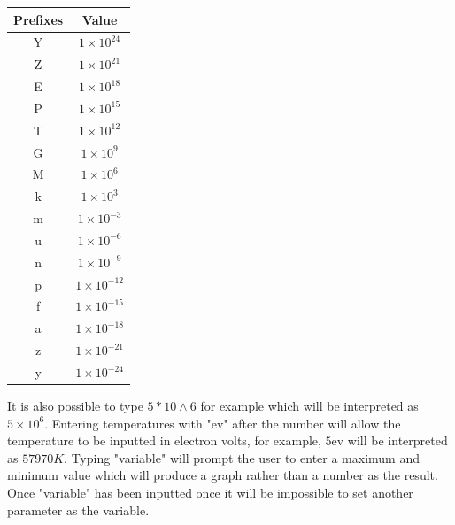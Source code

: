 \documentclass{journal}
\begin{document}
\smallskip

\begin{table}[H]
    \begin{adjustwidth}{4cm}{}
        \label{tab:ValueTable}
        \begin{tabular}{|c|c|} 
        \hline
        Prefixes & Value \\
        \hline
        Y  & $1 \times 10^{24}$ \\
        \hline
        Z & $1 \times 10^{21}$ \\
        \hline
        E & $1 \times 10^{18}$ \\
        \hline
        P & $1 \times 10^{15}$ \\
        \hline
        T & $1 \times 10^{12}$ \\
        \hline
        G & $1 \times 10^{9}$ \\
        \hline
        M & $1 \times 10^{6}$ \\
        \hline
        k & $1 \times 10^{3}$ \\
        \hline
        m & $1 \times 10^{-3}$ \\
        \hline
        u & $1 \times 10^{-6}$ \\
        \hline
        n & $1 \times 10^{-9}$ \\
        \hline
        p & $1 \times 10^{-12}$ \\
        \hline
        f & $1 \times 10^{-15}$ \\
        \hline
        a & $1 \times 10^{-18}$ \\
        \hline
        z & $1 \times 10^{-21}$ \\
        \hline
        y & $1 \times 10^{-24}$ \\
        \hline
        \end{tabular}
    \end{adjustwidth}
\end{table}

\smallskip

It is also possible to type $5 \ast 10 \wedge 6$ for example which will be interpreted as 
$5 \times 10^{6}$. Entering temperatures with "ev" after the number will allow the temperature to be 
inputted in electron volts, for example, $5$ev will be interpreted as $57970K$. 
Typing "variable" will prompt the user to enter a maximum and minimum value which will 
produce a graph rather than a number as the result. Once "variable" has been inputted once it 
will be impossible to set another parameter as the variable. 
\end{document}
